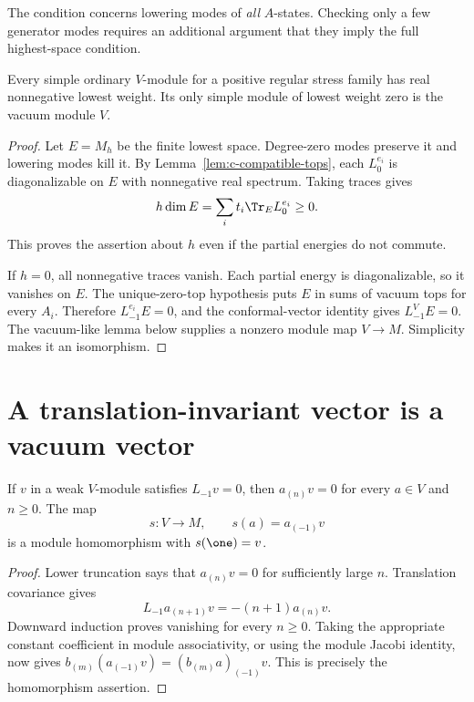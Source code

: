 The condition concerns lowering modes of \emph{all} $A$-states.
Checking only a few generator modes requires an additional argument
that they imply the full highest-space condition.

\begin{proposition}
Every simple ordinary $V$-module for a positive regular stress family
has real nonnegative lowest weight. Its only simple module of lowest
weight zero is the vacuum module $V$.
\end{proposition}
\begin{proof}
Let $E=M_h$ be the finite lowest space. Degree-zero modes preserve it
and lowering modes kill it. By Lemma~\ref{lem:c-compatible-tops}, each
$L^{e_i}_0$ is diagonalizable on $E$ with nonnegative real spectrum.
Taking traces gives
\begin{equation}\label{eq:c-top-positive-trace}
 h\dim E=\sum_i t_i\Tr_E L^{e_i}_0\geq0.
\end{equation}
This proves the assertion about $h$ even if the partial energies do
not commute.

If $h=0$, all nonnegative traces vanish. Each partial energy is
diagonalizable, so it vanishes on $E$. The unique-zero-top hypothesis
puts $E$ in sums of vacuum tops for every $A_i$. Therefore
$L^{e_i}_{-1}E=0$, and the conformal-vector identity gives
$L^V_{-1}E=0$. The vacuum-like lemma below supplies a nonzero module
map $V\to M$. Simplicity makes it an isomorphism.
\end{proof}

\section{A translation-invariant vector is a vacuum vector}

\begin{lemma}\label{lem:c-vacuumlike}
If $v$ in a weak $V$-module satisfies $L_{-1}v=0$, then
$a_{(n)}v=0$ for every $a\in V$ and $n\geq0$. The map
\[
 s:V\longrightarrow M,\qquad s(a)=a_{(-1)}v
\]
is a module homomorphism with $s(\one)=v$.
\end{lemma}
\begin{proof}
Lower truncation says that $a_{(n)}v=0$ for sufficiently large $n$.
Translation covariance gives
\[
 L_{-1}a_{(n+1)}v=-(n+1)a_{(n)}v.
\]
Downward induction proves vanishing for every $n\geq0$. Taking the
appropriate constant coefficient in module associativity, or using
the module Jacobi identity, now gives
$b_{(m)}(a_{(-1)}v)=(b_{(m)}a)_{(-1)}v$. This is precisely the
homomorphism assertion.
\end{proof}

